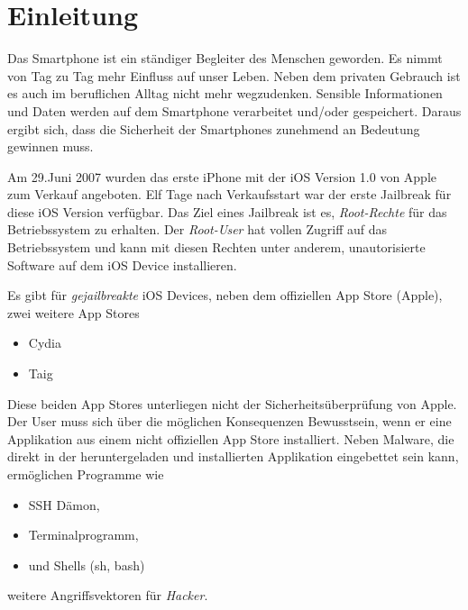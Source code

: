 %
%
%
% 


\chapter{Einleitung}
\label{ch:intro}

Das Smartphone ist ein ständiger Begleiter des Menschen geworden. Es nimmt von Tag zu Tag mehr Einfluss auf unser Leben. Neben dem privaten Gebrauch ist es auch im beruflichen Alltag nicht mehr wegzudenken. Sensible Informationen und Daten werden auf dem Smartphone verarbeitet und/oder gespeichert. Daraus ergibt sich, dass die Sicherheit der Smartphones zunehmend an Bedeutung gewinnen muss.\par 
Am 29.Juni 2007 wurden das erste iPhone mit der iOS Version 1.0 von Apple zum Verkauf angeboten. Elf Tage nach Verkaufsstart war der erste Jailbreak für diese iOS Version verfügbar. Das Ziel eines Jailbreak ist es, \textit{\glqq Root-Rechte\grqq{}}  für das Betriebssystem zu erhalten. Der \textit{\glqq Root-User\grqq{}} hat vollen Zugriff auf das Betriebssystem und kann mit diesen Rechten unter anderem, unautorisierte Software auf dem iOS Device installieren.\par 

Es gibt für \textit{\glqq gejailbreakte\grqq{}} iOS Devices, neben dem offiziellen App Store (Apple), zwei weitere App Stores
\begin{itemize}
    \item Cydia
    \item Taig
\end{itemize}
Diese beiden App Stores unterliegen nicht der Sicherheitsüberprüfung von Apple. Der User muss sich über die möglichen Konsequenzen Bewusstsein, wenn er eine Applikation aus einem nicht offiziellen App Store installiert. Neben Malware, die direkt in der heruntergeladen und installierten Applikation eingebettet sein kann, ermöglichen Programme wie 
\begin{itemize}
    \item SSH Dämon,
    \item Terminalprogramm,
    \item und Shells (sh, bash)
\end{itemize}
weitere Angriffsvektoren für \textit{\glqq Hacker\grqq{}}.

